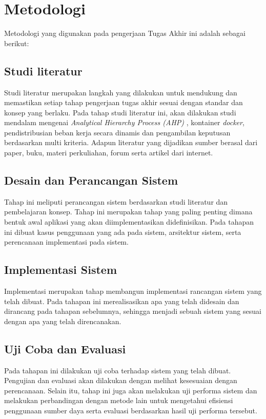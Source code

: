      \section{Metodologi}
     Metodologi yang digunakan pada pengerjaan Tugas Akhir ini
adalah sebagai berikut:
     \subsection{Studi literatur}
     Studi literatur merupakan langkah yang dilakukan untuk mendukung dan memastikan setiap tahap pengerjaan tugas akhir sesuai dengan standar dan konsep yang berlaku. Pada tahap studi literatur ini, akan dilakukan studi mendalam mengenai \textit{Analytical Hierarchy Process (AHP)} , kontainer \textit{docker}, pendistribusian beban kerja secara dinamis dan pengambilan keputusan berdasarkan multi kriteria. Adapun literatur yang dijadikan sumber berasal dari paper, buku, materi perkuliahan, forum serta artikel dari internet.

\subsection{Desain dan Perancangan Sistem}
Tahap ini meliputi perancangan sistem berdasarkan studi literatur dan pembelajaran konsep. Tahap ini merupakan tahap yang paling penting dimana bentuk awal aplikasi yang akan diimplementasikan didefinisikan. Pada tahapan ini dibuat kasus penggunaan yang ada pada sistem, arsitektur sistem, serta perencanaan implementasi pada sistem.
\subsection{Implementasi Sistem}
Implementasi merupakan tahap membangun implementasi rancangan sistem yang telah dibuat. Pada tahapan ini merealisasikan apa yang telah didesain dan dirancang pada tahapan sebelumnya, sehingga menjadi sebuah sistem yang sesuai dengan apa yang telah direncanakan.
\subsection{Uji Coba dan Evaluasi}
Pada tahapan ini dilakukan uji coba terhadap sistem yang telah dibuat. Pengujian dan evaluasi akan dilakukan dengan melihat kesesuaian dengan perencanaan. Selain itu, tahap ini juga akan melakukan uji performa sistem dan melakukan perbandingan dengan metode lain untuk mengetahui efisiensi penggunaan sumber daya serta evaluasi berdasarkan hasil uji performa tersebut. 

